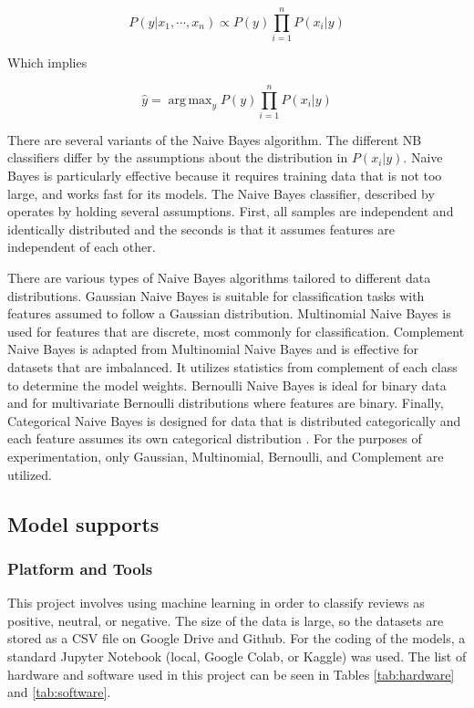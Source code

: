 \documentclass[stu,12pt,floatsintext]{apa7}
\DeclareMathOperator*{\argmax}{arg\,max}
\begin{document}
\begin{equation}
    P(y|x_1,\cdots , x_n) \propto P(y)\prod\limits_{i=1}^{n}P(x_i|y)
\end{equation}

Which implies

\begin{equation}
    \hat y = \argmax_y P(y) \prod\limits_{i=1}^{n}P(x_i|y)
\end{equation}

There are several variants of the Naive Bayes algorithm. The different NB classifiers differ by the assumptions about the distribution in $P(x_i | y)$. Naive Bayes is particularly effective because it requires training data that is not too large, and works fast for its models. The Naive Bayes classifier, described by \textcite{li2020sentiment} operates by holding several assumptions. First, all samples are independent and identically distributed and the seconds is that it assumes features are independent of each other. 

There are various types of Naive Bayes algorithms tailored to different data distributions. Gaussian Naive Bayes is suitable for classification tasks with features assumed to follow a Gaussian distribution. Multinomial Naive Bayes is used for features that are discrete, most commonly for classification. Complement Naive Bayes is adapted from Multinomial Naive Bayes and is effective for datasets that are imbalanced. It utilizes statistics from complement of each class to determine the model weights. Bernoulli Naive Bayes is ideal for binary data and for multivariate Bernoulli distributions where features are binary. Finally, Categorical Naive Bayes is designed for data that is distributed categorically and each feature assumes its own categorical distribution \parencite{scikit-learn}. For the purposes of experimentation, only Gaussian, Multinomial, Bernoulli, and Complement are utilized.


\subsection{Model supports}
\subsubsection{Platform and Tools}
This project involves using machine learning in order to classify reviews as positive, neutral, or negative. The size of the data is large, so the datasets are stored as a CSV file on Google Drive and Github. For the coding of the models, a standard Jupyter Notebook (local, Google Colab, or Kaggle) was used. The list of hardware and software used in this project can be seen in Tables \ref{tab:hardware} and \ref{tab:software}.
\end{document}
